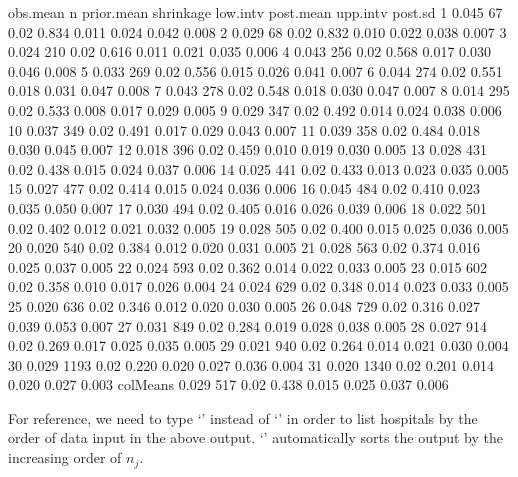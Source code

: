 \documentclass[article]{jss}
\begin{document}
\begin{CodeChunk}
\begin{CodeOutput}
         obs.mean    n prior.mean shrinkage low.intv post.mean upp.intv post.sd
1           0.045   67       0.02     0.834    0.011     0.024    0.042   0.008
2           0.029   68       0.02     0.832    0.010     0.022    0.038   0.007
3           0.024  210       0.02     0.616    0.011     0.021    0.035   0.006
4           0.043  256       0.02     0.568    0.017     0.030    0.046   0.008
5           0.033  269       0.02     0.556    0.015     0.026    0.041   0.007
6           0.044  274       0.02     0.551    0.018     0.031    0.047   0.008
7           0.043  278       0.02     0.548    0.018     0.030    0.047   0.007
8           0.014  295       0.02     0.533    0.008     0.017    0.029   0.005
9           0.029  347       0.02     0.492    0.014     0.024    0.038   0.006
10          0.037  349       0.02     0.491    0.017     0.029    0.043   0.007
11          0.039  358       0.02     0.484    0.018     0.030    0.045   0.007
12          0.018  396       0.02     0.459    0.010     0.019    0.030   0.005
13          0.028  431       0.02     0.438    0.015     0.024    0.037   0.006
14          0.025  441       0.02     0.433    0.013     0.023    0.035   0.005
15          0.027  477       0.02     0.414    0.015     0.024    0.036   0.006
16          0.045  484       0.02     0.410    0.023     0.035    0.050   0.007
17          0.030  494       0.02     0.405    0.016     0.026    0.039   0.006
18          0.022  501       0.02     0.402    0.012     0.021    0.032   0.005
19          0.028  505       0.02     0.400    0.015     0.025    0.036   0.005
20          0.020  540       0.02     0.384    0.012     0.020    0.031   0.005
21          0.028  563       0.02     0.374    0.016     0.025    0.037   0.005
22          0.024  593       0.02     0.362    0.014     0.022    0.033   0.005
23          0.015  602       0.02     0.358    0.010     0.017    0.026   0.004
24          0.024  629       0.02     0.348    0.014     0.023    0.033   0.005
25          0.020  636       0.02     0.346    0.012     0.020    0.030   0.005
26          0.048  729       0.02     0.316    0.027     0.039    0.053   0.007
27          0.031  849       0.02     0.284    0.019     0.028    0.038   0.005
28          0.027  914       0.02     0.269    0.017     0.025    0.035   0.005
29          0.021  940       0.02     0.264    0.014     0.021    0.030   0.004
30          0.029 1193       0.02     0.220    0.020     0.027    0.036   0.004
31          0.020 1340       0.02     0.201    0.014     0.020    0.027   0.003
colMeans    0.029  517       0.02     0.438    0.015     0.025    0.037   0.006
\end{CodeOutput}
\end{CodeChunk}
For reference, we need to type `' instead of `' in order to list hospitals by the order of data input in the above output. `' automatically sorts the output by the increasing order of $n_{j}$. 
\\
\end{document}
